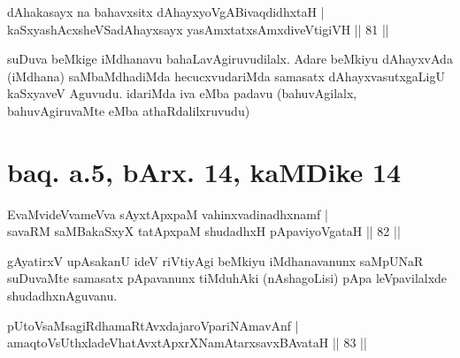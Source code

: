 
\begin{shl}
dAhakasayx na bahavxsitx dAhayxyoVgABivaqdidhxtaH | \\
kaSxyashAcxsheVSadAhayxsayx yasAmxtatxsAmxdiveVtigiVH \hfill||  81 || 
\end{shl}

\begin{artha} 
suDuva beMkige iMdhanavu bahaLavAgiruvudilalx. Adare beMkiyu 
dAhayxvAda (iMdhana) saMbaMdhadiMda hecucxvudariMda samasatx 
dAhayxvasutxgaLigU kaSxyaveV Aguvudu. idariMda iva eMba padavu 
(bahuvAgilalx, bahuvAgiruvaMte eMba athaRdalilxruvudu)
\end{artha}

\section*{baq. a.5, bArx. 14, kaMDike 14}

\begin{shl}
EvaMvideVvameVva sAyxtApxpaM vahinxvadinadhxnamf | \\
savaRM saMBakaSxyX tatApxpaM shudadhxH pApaviyoVgataH \hfill||  82 ||
\end{shl}

\begin{artha} 
gAyatirxV upAsakanU ideV riVtiyAgi beMkiyu iMdhanavanunx saMpUNaR 
suDuvaMte samasatx pApavanunx tiMduhAki (nAshagoLisi) pApa 
leVpavilalxde shudadhxnAguvanu.
\end{artha}


\begin{shl}
\footnotemark[1]{}pUtoV\s saMsagiRdhamaRtAvxdajaroV\s pariNAmavAnf | \\
amaqtoV\s sUthxladeVhatAvxtApxrXNamAtarxsavxBAvataH \hfill||  83 || 
\end{shl}

